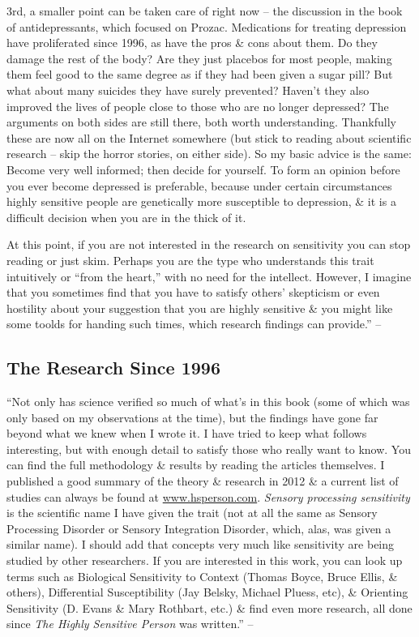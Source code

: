 \documentclass{article}
\numberwithin{equation}{section}
\begin{document}
3rd, a smaller point can be taken care of right now -- the discussion in the book of antidepressants, which focused on Prozac. Medications for treating depression have proliferated since 1996, as have the pros \& cons about them. Do they damage the rest of the body? Are they just placebos for most people, making them feel good to the same degree as if they had been given a sugar pill? But what about many suicides they have surely prevented? Haven't they also improved the lives of people close to those who are no longer depressed? The arguments on both sides are still there, both worth understanding. Thankfully these are now all on the Internet somewhere (but stick to reading about scientific research -- skip the horror stories, on either side). So my basic advice is the same: Become very well informed; then decide for yourself. To form an opinion before you ever become depressed is preferable, because under certain circumstances highly sensitive people are genetically more susceptible to depression, \& it is a difficult decision when you are in the thick of it.

At this point, if you are not interested in the research on sensitivity you can stop reading or just skim. Perhaps you are the type who understands this trait intuitively or ``from the heart,'' with no need for the intellect. However, I imagine that you sometimes find that you have to satisfy others' skepticism or even hostility about your suggestion that you are highly sensitive \& you might like some toolds for handing such times, which research findings can provide.'' -- \cite[p. 10]{Aron2013}

\subsection*{The Research Since 1996}
``Not only has science verified so much of what's in this book (some of which was only based on my observations at the time), but the findings have gone far beyond what we knew when I wrote it. I have tried to keep what follows interesting, but with enough detail to satisfy those who really want to know. You can find the full methodology \& results by reading the articles themselves. I published a good summary of the theory \& research in 2012 \& a current list of studies can always be found at \url{www.hsperson.com}. \textit{Sensory processing sensitivity} is the scientific name I have given the trait (not at all the same as Sensory Processing Disorder or Sensory Integration Disorder, which, alas, was given a similar name). I should add that concepts very much like sensitivity are being studied by other researchers. If you are interested in this work, you can look up terms such as Biological Sensitivity to Context (Thomas Boyce, Bruce Ellis, \& others), Differential Susceptibility (Jay Belsky, Michael Pluess, etc), \& Orienting Sensitivity (D. Evans \& Mary Rothbart, etc.) \& find even more research, all done since \textit{The Highly Sensitive Person} was written.'' -- \cite[p. 11]{Aron2013}
\end{document}
